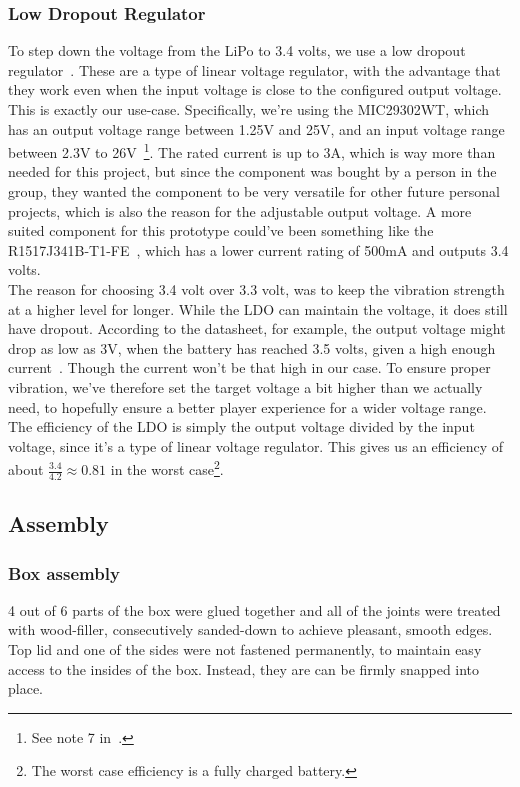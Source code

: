 \documentclass[acmsmall]{acmart}
\begin{document}
\subsubsection{Low Dropout Regulator}\label{sec_component_ldo}
To step down the voltage from the LiPo to 3.4 volts, we use a low dropout regulator~\cite{ldo}. These are a type of linear voltage regulator, with the advantage that they work 
even when the input voltage is close to the configured output voltage. This is exactly our use-case. Specifically, we're using the MIC29302WT, which has an output voltage 
range between 1.25V and 25V, and an input voltage range between 2.3V to 26V~\cite[][p.4-7]{ldo}\footnote{See note 7 in~\cite[][p.7]{ldo}.}. The rated current is up to 3A, 
which is way more than needed for this project, but since the component was bought by a person in the group, 
they wanted the component to be very versatile for other future personal projects, which is also the reason for the adjustable output voltage. 
A more suited component for this prototype could've been something like the R1517J341B-T1-FE~\cite{ldoalternative}, 
which has a lower current rating of 500mA and outputs 3.4 volts. 
\\
The reason for choosing 3.4 volt over 3.3 volt, was to keep the vibration strength at a higher level for longer. While the LDO can maintain the voltage, it does still have dropout. According
to the datasheet, for example, the output voltage might drop as low as 3V, when the battery has reached 3.5 volts, given a high enough current~\cite[][p.12]{ldo}. 
Though the current won't be that high in our case. To ensure proper vibration, we've therefore set the target voltage a bit higher than we actually need, 
to hopefully ensure a better player experience for a wider voltage range. \\[0.5pt]

\noindent The efficiency of the LDO is simply the output voltage divided by the input voltage, since it's a type of linear voltage regulator. This gives us an efficiency of about 
$\frac{3.4}{4.2} \approx 0.81$ in the worst case\footnote{The worst case efficiency is a fully charged battery. }.

\subsection{Assembly}
\subsubsection{Box assembly}
4 out of 6 parts of the box were glued together and all of the joints were treated with wood-filler, consecutively sanded-down to achieve pleasant, smooth edges. Top lid and one of the sides were not fastened permanently, to maintain easy access to the insides of the box. Instead, they are can be firmly snapped into place.
\end{document}
